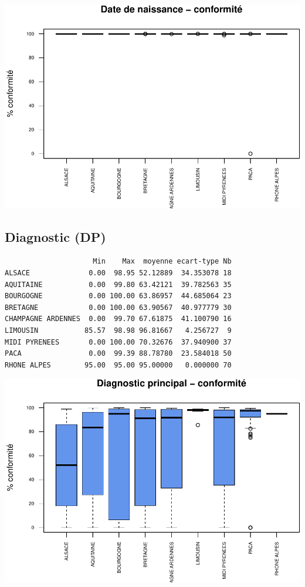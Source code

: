 \documentclass[]{article}
\begin{document}
\includegraphics{septembre2015_files/figure-latex/unnamed-chunk-25-1.pdf}

\subsection{Diagnostic (DP)}\label{diagnostic-dp-1}

\begin{verbatim}
                     Min    Max  moyenne ecart-type Nb
ALSACE              0.00  98.95 52.12889  34.353078 18
AQUITAINE           0.00  99.80 63.42121  39.782563 35
BOURGOGNE           0.00 100.00 63.86957  44.685064 23
BRETAGNE            0.00 100.00 63.90567  40.977779 30
CHAMPAGNE ARDENNES  0.00  99.70 67.61875  41.100790 16
LIMOUSIN           85.57  98.98 96.81667   4.256727  9
MIDI PYRENEES       0.00 100.00 70.32676  37.940900 37
PACA                0.00  99.39 88.78780  23.584018 50
RHONE ALPES        95.00  95.00 95.00000   0.000000 70
\end{verbatim}

\includegraphics{septembre2015_files/figure-latex/unnamed-chunk-26-1.pdf}
\end{document}
